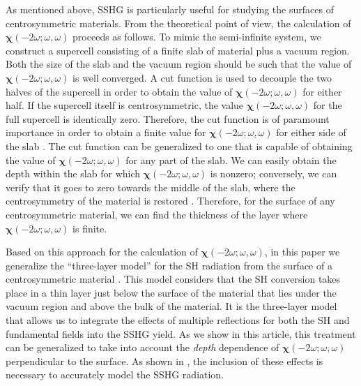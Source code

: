 \documentclass[utf8]{frontiersSCNS}
\begin{document}
As mentioned above, SSHG is particularly useful for studying the surfaces of
centrosymmetric materials. From the theoretical point of view, the calculation
of $\boldsymbol{\chi}(-2\omega;\omega,\omega)$ proceeds as follows. To mimic the
semi-infinite system, we construct a supercell consisting of a finite slab of
material plus a vacuum region. Both the size of the slab and the vacuum region
should be such that the value of $\boldsymbol{\chi}(-2\omega;\omega,\omega)$ is
well converged.  A cut function is used to decouple the two halves of the
supercell in order to obtain the value of
$\boldsymbol{\chi}(-2\omega;\omega,\omega)$ for either half. If the supercell
itself is centrosymmetric, the value $\boldsymbol{\chi}(-2\omega;\omega,\omega)$
for the full supercell is identically zero. Therefore, the cut function is of
paramount importance in order to obtain a finite value for
$\boldsymbol{\chi}(-2\omega;\omega,\omega)$ for either side of the slab
\citep{reiningPRB94,andersonPRB15,andersonPRB16a}. The cut function can be
generalized to one that is capable of obtaining the value of
$\boldsymbol{\chi}(-2\omega;\omega,\omega)$ for any part of the slab. We can
easily obtain the depth within the slab for which
$\boldsymbol{\chi}(-2\omega;\omega,\omega)$ is nonzero; conversely, we can
verify that it goes to zero towards the middle of the slab, where the
centrosymmetry of the material is restored \citep{mejiaRMF04}. Therefore, for
the surface of any centrosymmetric material, we can find the thickness of the
layer where $\boldsymbol{\chi}(-2\omega;\omega,\omega)$ is finite.

Based on this approach for the calculation of
$\boldsymbol{\chi}(-2\omega;\omega,\omega)$, in this paper we generalize the
``three-layer model'' for the SH radiation from the surface of a centrosymmetric
material \citep{andersonPRB16b}. This model considers that the SH conversion
takes place in a thin layer just below the surface of the material that lies
under the vacuum region and above the bulk of the material. It is the
three-layer model that allows us to integrate the effects of multiple
reflections for both the SH and fundamental fields into the SSHG yield. As we
show in this article, this treatment can be generalized to take into account the
\emph{depth} dependence of $\boldsymbol{\chi}(-2\omega;\omega,\omega)$
perpendicular to the surface. As shown in \cite{andersonPRB16b}, the inclusion
of these effects is necessary to accurately model the SSHG radiation.
\end{document}
